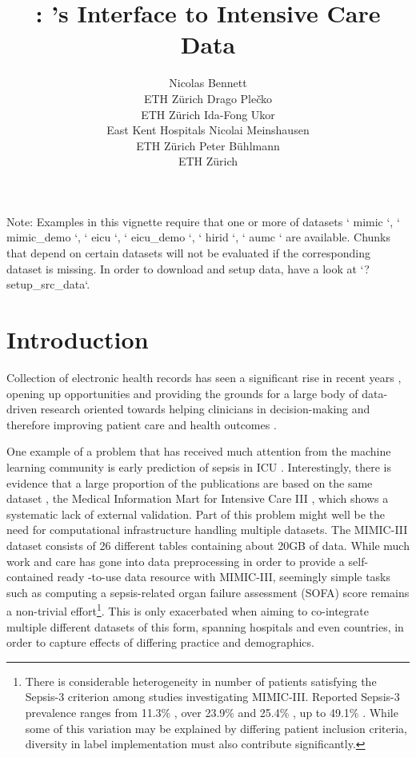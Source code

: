 \documentclass[
]{jss}
\author{
Nicolas Bennett\footnotemark[1]\\ETH Zürich \And Drago
Plečko\footnotemark[1]\footnotetext[1]{These authors contributed equally.}\\ETH Zürich \And Ida-Fong Ukor\\East Kent Hospitals \AND Nicolai Meinshausen\\ETH Zürich \And Peter Bühlmann\\ETH Zürich
}
\title{\pkg{ricu}: \proglang{R}'s Interface to Intensive Care Data}
\begin{document}
\begin{CodeChunk}
\begin{CodeOutput}
Note: Examples in this vignette require that one or more of datasets `
mimic `, ` mimic_demo `, ` eicu `, ` eicu_demo `, ` hirid `, ` aumc `
are available. Chunks that depend on certain datasets will not be
evaluated if the corresponding dataset is missing. In order to download
and setup data, have a look at `?setup_src_data`.
\end{CodeOutput}
\end{CodeChunk}

\hypertarget{introduction}{%
\section{Introduction}\label{introduction}}

Collection of electronic health records has seen a significant rise in
recent years \citep{evans2016}, opening up opportunities and providing
the grounds for a large body of data-driven research oriented towards
helping clinicians in decision-making and therefore improving patient
care and health outcomes \citep{jiang2017}.

One example of a problem that has received much attention from the
machine learning community is early prediction of sepsis in ICU
\citep{desautels2016, nemati2018, futoma2017, kam2017}. Interestingly,
there is evidence that a large proportion of the publications are based
on the same dataset \citep{fleuren2019}, the Medical Information Mart
for Intensive Care III \citep[MIMIC-III;][]{johnson2016}, which shows a
systematic lack of external validation. Part of this problem might well
be the need for computational infrastructure handling multiple datasets.
The MIMIC-III dataset consists of 26 different tables containing about
20GB of data. While much work and care has gone into data preprocessing
in order to provide a self-contained ready -to-use data resource with
MIMIC-III, seemingly simple tasks such as computing a sepsis-related
organ failure assessment (SOFA) score \citep{vincent1996} remains a
non-trivial effort\footnote{There is considerable heterogeneity in
  number of patients satisfying the Sepsis-3 criterion
  \citep[of which SOFA provides a major component;][]{singer2016} among
  studies investigating MIMIC-III. Reported Sepsis-3 prevalence ranges
  from 11.3\% \citep{desautels2016}, over 23.9\% \citep{nemati2018} and
  25.4\% \citep{wang2018}, up to 49.1\% \citep{johnson2018}. While some
  of this variation may be explained by differing patient inclusion
  criteria, diversity in label implementation must also contribute
  significantly.}. This is only exacerbated when aiming to co-integrate
multiple different datasets of this form, spanning hospitals and even
countries, in order to capture effects of differing practice and
demographics.
\end{document}
